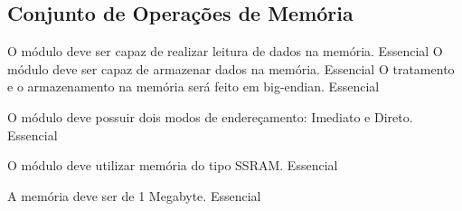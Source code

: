 \subsection{Conjunto de Operações de Memória}

	  \begin{functional}
		{O módulo deve ser capaz de realizar leitura de dados na memória.}
		{Essencial}
        {O módulo deve ser capaz de armazenar dados na memória.}
        {Essencial}
        {O tratamento e o armazenamento na memória será feito em big-endian.}
        {Essencial}
        
        {O módulo deve possuir dois modos de endereçamento: Imediato e Direto.}
        {Essencial}
        
        {O módulo deve utilizar memória do tipo SSRAM.}
        {Essencial}
        
        {A memória deve ser de 1 Megabyte.}
        {Essencial}
		 
	 \end{functional}